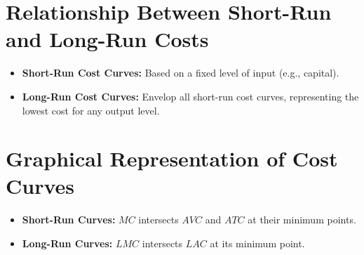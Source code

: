 \section*{Relationship Between Short-Run and Long-Run Costs}
\begin{itemize}
    \item \textbf{Short-Run Cost Curves:} Based on a fixed level of input (e.g., capital).
    \item \textbf{Long-Run Cost Curves:} Envelop all short-run cost curves, representing the lowest cost for any output level.
\end{itemize}

\section*{Graphical Representation of Cost Curves}
\begin{itemize}
    \item \textbf{Short-Run Curves:} \(MC\) intersects \(AVC\) and \(ATC\) at their minimum points.
    \item \textbf{Long-Run Curves:} \(LMC\) intersects \(LAC\) at its minimum point.
\end{itemize}